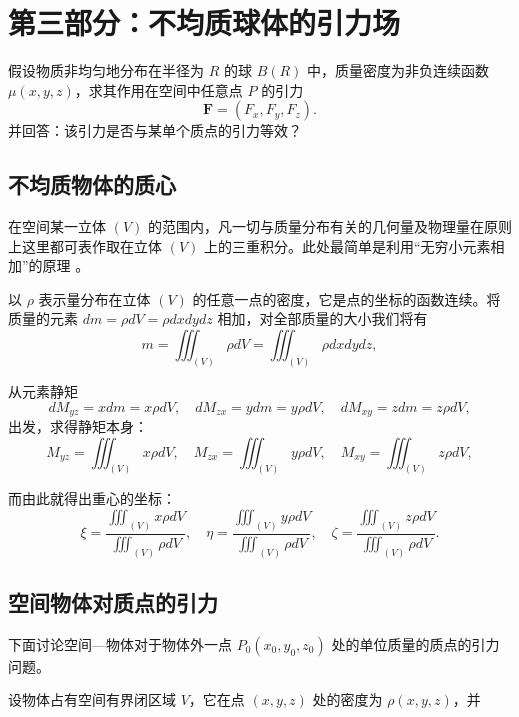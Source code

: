\documentclass[12pt]{ctexart}
\begin{document}
\newpage
\section{第三部分：不均质球体的引力场}
\setcounter{section}{3} %
\setcounter{subsection}{0} %
假设物质非均匀地分布在半径为 $R$ 的球 $B(R)$ 中，质量密度为非负连续函数 $\mu(x, y, z)$，求其作用在空间中任意点 $P$ 的引力
\[
\mathbf{F} = (F_x, F_y, F_z).
\]
并回答：该引力是否与某单个质点的引力等效？

\subsection{不均质物体的质心}
在空间某一立体 $(V)$ 的范围内，凡一切与质量分布有关的几何量及物理量在原则上这里都可表作取在立体 $(V)$ 上的三重积分。此处最简单是利用“无穷小元素相加”的原理 。\cite{key10}

以 $\rho$ 表示量分布在立体 $(V)$ 的任意一点的密度，它是点的坐标的函数连续。将质量的元素 $dm = \rho dV = \rho dx dy dz$ 相加，对全部质量的大小我们将有
\begin{equation} \label{eq:mass}
m = \iiint_{(V)} \rho dV = \iiint_{(V)} \rho dx dy dz, \tag{3-1}
\end{equation}

从元素静矩
\[
dM_{yz} = x dm = x \rho dV, \quad dM_{zx} = y dm = y \rho dV, \quad dM_{xy} = z dm = z \rho dV,
\]
出发，求得静矩本身：
\begin{equation} \label{eq:static_moments}
M_{yz} = \iiint_{(V)} x \rho dV, \quad
M_{zx} = \iiint_{(V)} y \rho dV, \quad
M_{xy} = \iiint_{(V)} z \rho dV, 
\end{equation}

而由此就得出重心的坐标：
\begin{equation} \label{eq:center_of_mass}
\xi = \frac{\iiint_{(V)} x \rho dV}{\iiint_{(V)} \rho dV}, \quad
\eta = \frac{\iiint_{(V)} y \rho dV}{\iiint_{(V)} \rho dV}, \quad
\zeta = \frac{\iiint_{(V)} z \rho dV}{\iiint_{(V)} \rho dV}. \tag{3-2}
\end{equation}

\subsection{空间物体对质点的引力}
下面讨论空间—物体对于物体外一点 $P_0(x_0, y_0, z_0)$ 处的单位质量的质点的引力问题。

设物体占有空间有界闭区域 $V$，它在点 $(x, y, z)$ 处的密度为 $\rho(x, y, z)$，并
\end{document}
